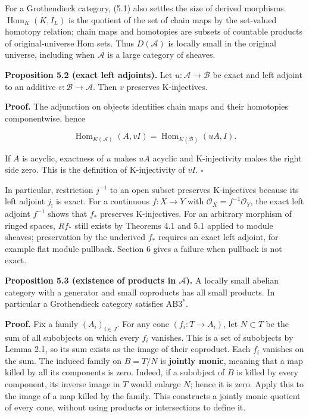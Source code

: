 \documentclass[
  english,
  11pt,
  a4paper,
]{article}
\begin{document}
For a Grothendieck category, (5.1) also settles the size of derived
morphisms. \(\operatorname{Hom}_{K}(K,I_L)\) is the quotient of the set
of chain maps by the set-valued homotopy relation; chain maps and
homotopies are subsets of countable products of original-universe Hom
sets. Thus \(D(\mathcal A)\) is locally small in the original universe,
including when \(\mathcal A\) is a large category of sheaves.

\textbf{Proposition 5.2 (exact left adjoints).} Let
\(u:\mathcal A\to\mathcal B\) be exact and left adjoint to an additive
\(v:\mathcal B\to\mathcal A\). Then \(v\) preserves K-injectives.

\textbf{Proof.} The adjunction on objects identifies chain maps and
their homotopies componentwise, hence

\[\operatorname{Hom}_{K(\mathcal A)}(A,vI)
=\operatorname{Hom}_{K(\mathcal B)}(uA,I).\]

If \(A\) is acyclic, exactness of \(u\) makes \(uA\) acyclic and
K-injectivity makes the right side zero. This is the definition of
K-injectivity of \(vI\). \(\square\)

In particular, restriction \(j^{-1}\) to an open subset preserves
K-injectives because its left adjoint \(j_!\) is exact. For a continuous
\(f:X\to Y\) with \(\mathcal O_X=f^{-1}\mathcal O_Y\), the exact left
adjoint \(f^{-1}\) shows that \(f_*\) preserves K-injectives. For an
arbitrary morphism of ringed spaces, \(Rf_*\) still exists by Theorems
4.1 and 5.1 applied to module sheaves; preservation by the underived
\(f_*\) requires an exact left adjoint, for example flat module
pullback. Section 6 gives a failure when pullback is not exact.

\textbf{Proposition 5.3 (existence of products in \(\mathcal A\)).} A
locally small abelian category with a generator and small coproducts has
all small products. In particular a Grothendieck category satisfies
\(\mathrm{AB3}^{*}\).

\textbf{Proof.} Fix a family \((A_i)_{i\in J}\). For any cone
\((f_i:T\to A_i)\), let \(N\subset T\) be the sum of all subobjects on
which every \(f_i\) vanishes. This is a set of subobjects by Lemma 2.1,
so its sum exists as the image of their coproduct. Each \(f_i\) vanishes
on the sum. The induced family on \(B=T/N\) is \textbf{jointly monic},
meaning that a map killed by all its components is zero. Indeed, if a
subobject of \(B\) is killed by every component, its inverse image in
\(T\) would enlarge \(N\); hence it is zero. Apply this to the image of
a map killed by the family. This constructs a jointly monic quotient of
every cone, without using products or intersections to define it.
\end{document}
